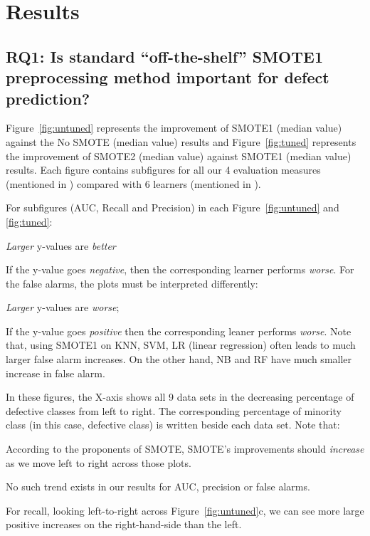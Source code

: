 \section{Results}
\label{sect:results}

\subsection{\textbf{RQ1: Is standard ``off-the-shelf'' SMOTE1 preprocessing method important for defect prediction?}}
Figure~\ref{fig:untuned} represents the improvement of SMOTE1 (median value) against the No SMOTE (median value) results and Figure~\ref{fig:tuned} represents the improvement of SMOTE2 (median value) against SMOTE1 (median value) results. Each figure contains subfigures for all our 4 evaluation measures (mentioned in ) compared with 6 learners (mentioned in ). 



For subfigures (AUC, Recall and Precision) in each Figure~\ref{fig:untuned} and \ref{fig:tuned}:
\bi
\item 
{\em Larger} y-values
are {\em better} 
\item
If the y-value goes {\em negative}, then the corresponding learner performs {\em worse}. 
\ei
For the false alarms, the
plots must be interpreted differently:
\bi
\item
{\em Larger} y-values are {\em worse};
\item
If the y-value goes {\em positive} then
the corresponding leaner
performs {\em worse}.
\ei
Note that, using SMOTE1 on KNN, SVM,
LR (linear regression) often
leads to much larger false alarm increases.
On the other hand,   NB
and RF have much smaller
increase in false alarm.

In these figures, the
X-axis shows all 9 data sets in the decreasing percentage of defective classes from left to right. The corresponding percentage of minority class (in this case, defective class) is written beside each data set. Note that:
\bi
\item
According to the proponents
of SMOTE, SMOTE's improvements should
{\em increase} as we move left to right
across those plots.
\item
No such trend exists in our results for
AUC, precision or false alarms.
\item
For recall, looking left-to-right across
Figure~\ref{fig:untuned}c, we can see
more large positive increases on the
right-hand-side than the left.
\ei

